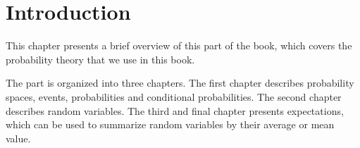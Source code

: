 \chapter{Introduction}
\label{ch:probability::introduction}

\begin{preamble}
This chapter presents a brief overview of this part of the book, which
covers the probability theory that we use in this book.
%

\end{preamble}

\begin{gram}
%

The part is organized into three chapters. 
%
The first chapter describes probability spaces, events, probabilities
and conditional probabilities.
%
The second chapter describes random variables.
%
The third and final chapter presents expectations, which can be used
to summarize random variables by their average or mean value.
%
\end{gram}


